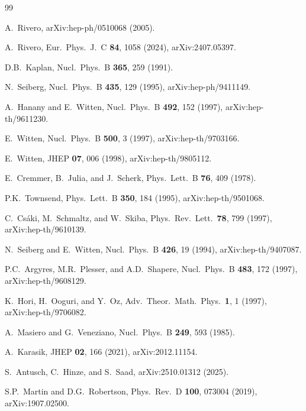 \documentclass[aps,prd,twocolumn,showpacs,preprintnumbers,superscriptaddress,floatfix]{revtex4-2}
\begin{document}
\begin{thebibliography}{99}

  A.~Rivero,
  arXiv:hep-ph/0510068 (2005).

  A.~Rivero,
  Eur.\ Phys.\ J.\ C \textbf{84}, 1058 (2024),
  arXiv:2407.05397.

  D.B.~Kaplan,
  Nucl.\ Phys.\ B \textbf{365}, 259 (1991).

  N.~Seiberg,
  Nucl.\ Phys.\ B \textbf{435}, 129 (1995),
  arXiv:hep-ph/9411149.

  A.~Hanany and E.~Witten,
  Nucl.\ Phys.\ B \textbf{492}, 152 (1997),
  arXiv:hep-th/9611230.

  E.~Witten,
  Nucl.\ Phys.\ B \textbf{500}, 3 (1997),
  arXiv:hep-th/9703166.

  E.~Witten,
  JHEP \textbf{07}, 006 (1998),
  arXiv:hep-th/9805112.

  E.~Cremmer, B.~Julia, and J.~Scherk,
  Phys.\ Lett.\ B \textbf{76}, 409 (1978).

  P.K.~Townsend,
  Phys.\ Lett.\ B \textbf{350}, 184 (1995),
  arXiv:hep-th/9501068.

  C.~Cs\'aki, M.~Schmaltz, and W.~Skiba,
  Phys.\ Rev.\ Lett.\ \textbf{78}, 799 (1997),
  arXiv:hep-th/9610139.

  N.~Seiberg and E.~Witten,
  Nucl.\ Phys.\ B \textbf{426}, 19 (1994),
  arXiv:hep-th/9407087.

  P.C.~Argyres, M.R.~Plesser, and A.D.~Shapere,
  Nucl.\ Phys.\ B \textbf{483}, 172 (1997),
  arXiv:hep-th/9608129.

  K.~Hori, H.~Ooguri, and Y.~Oz,
  Adv.\ Theor.\ Math.\ Phys.\ \textbf{1}, 1 (1997),
  arXiv:hep-th/9706082.

  A.~Masiero and G.~Veneziano,
  Nucl.\ Phys.\ B \textbf{249}, 593 (1985).

  A.~Karasik,
  JHEP \textbf{02}, 166 (2021),
  arXiv:2012.11154.

  S.~Antusch, C.~Hinze, and S.~Saad,
  arXiv:2510.01312 (2025).

  S.P.~Martin and D.G.~Robertson,
  Phys.\ Rev.\ D \textbf{100}, 073004 (2019),
  arXiv:1907.02500.


\end{thebibliography}
\end{document}
